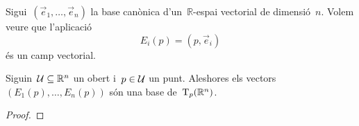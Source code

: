 \documentclass[../../main.tex]{subfiles}
\begin{document}
	\begin{example}%
		\label{ex:camp vectorial canònic}
		Sigui~\((\vec{e}_{1},\dots,\vec{e}_{n})\) la base canònica d'un~\(\mathbb{R}\)-espai vectorial de dimensió~\(n\).
		Volem veure que l'aplicació
		\[
		    E_{i}(p)=(p,\vec{e}_{i})
		\]
		és un camp vectorial.
		\begin{solution}
		\end{solution}
	\end{example}
	\begin{proposition}
		\label{prop:els camps vectorials canònics són una base de l'espai tangent}
		Siguin~\(\mathcal{U}\subseteq\mathbb{R}^{n}\) un obert i~\(p\in\mathcal{U}\) un punt.
		Aleshores els vectors~\((E_{1}(p),\dots,E_{n}(p))\) són una base de~\(\operatorname{T}_{p}(\mathbb{R}^{n})\).
		\begin{proof}
		\end{proof}
	\end{proposition}
\end{document}
